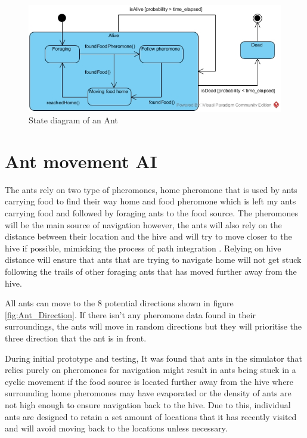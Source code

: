 \documentclass[a4paper, oneside, 11pt]{report}
\begin{document}
\begin{figure}[htb]
	\begin{center}
	\includegraphics[width=0.8 \columnwidth]{State_Diagram.jpg}
	\caption{State diagram of an Ant}
	\label{fig:State_Diagram}
	\end{center}
\end{figure}


\section{Ant movement AI} \label{Ant:AI}
The ants rely on two type of pheromones, home pheromone that is used by ants carrying food to find their way home and food pheromone which is left my ants carrying food and followed by foraging ants to the food source. The pheromones will be the main source of navigation however, the ants will also rely on the distance between their location and the hive and will try to move closer to the hive if possible, mimicking the process of path integration \citep{Ant_Path_Integration}. Relying on hive distance will ensure that ants that are trying to navigate home will not get stuck following the trails of other foraging ants that has moved further away from the hive.

All ants can move to the 8 potential directions shown in figure \ref{fig:Ant_Direction}. If there isn't any pheromone data found in their surroundings, the ants will move in random directions but they will prioritise the three direction that the ant is in front. 

During initial prototype and testing, It was found that ants in the simulator that relies purely on pheromones for navigation might result in ants being stuck in a cyclic movement if the food source is located further away from the hive where surrounding home pheromones may have evaporated or the density of ants are not high enough to ensure navigation back to the hive. Due to this, individual ants are designed to retain a set amount of locations that it has  recently visited and will avoid moving back to the locations unless necessary. 
\end{document}
